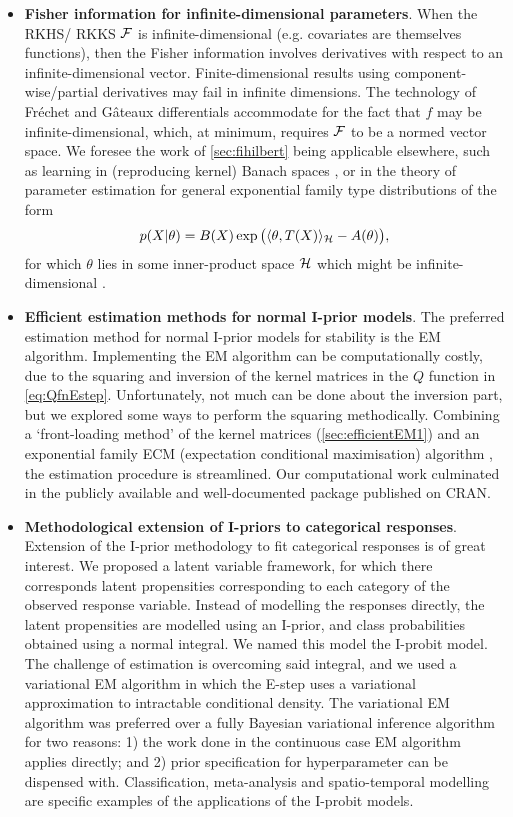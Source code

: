 \documentclass[showframe,11pt,twoside,openright]{report}
\begin{document}
\begin{itemize}
  \item \textbf{Fisher information for infinite-dimensional parameters}. 
  When the RKHS/ RKKS ${\mathcal F}$ is infinite-dimensional (e.g. covariates are themselves functions), then the Fisher information involves derivatives with respect to an infinite-dimensional vector.
  Finite-dimensional results using component-wise/partial derivatives may fail in infinite dimensions.
  The technology of Fréchet and Gâteaux differentials accommodate for the fact that $f$ may be infinite-dimensional, which, at minimum, requires ${\mathcal F}$ to be a  normed vector space. 
  We foresee the work of \cref{sec:fihilbert} being applicable elsewhere, such as learning in (reproducing kernel) Banach spaces \citep{zhang2009reproducing,zhang2012regularized}, or in the theory of parameter estimation for general exponential family type distributions of the form
  \[
    p(X|\theta) = B(X)\exp\big(\langle\theta,T(X)\rangle_{\mathcal H} - A(\theta) \big),
  \]
  for which $\theta$ lies in some inner-product space ${\mathcal H}$ which might be infinite-dimensional \citep{sriperumbudur2013density}.
  
  \item \textbf{Efficient estimation methods for normal I-prior models}. 
  The preferred estimation method for normal I-prior models for stability is the EM algorithm.
  Implementing the EM algorithm can be computationally costly, due to the squaring and inversion of the kernel matrices in the $Q$ function in \cref{eq:QfnEstep}.
  Unfortunately, not much can be done about the inversion part, but we explored some ways to perform the squaring methodically.
  Combining a `front-loading method' of the kernel matrices (\cref{sec:efficientEM1}) and an exponential family ECM (expectation conditional maximisation) algorithm \citep{meng1993maximum}, the estimation procedure is streamlined.
  Our computational work culminated in the publicly available and well-documented  package  \citep{jamil2017iprior} published on CRAN.
  
  \item \textbf{Methodological extension of I-priors to categorical responses}.
  Extension of the I-prior methodology to fit categorical responses is of great interest.
  We proposed a latent variable framework, for which there corresponds latent propensities corresponding to each category of the observed response variable.
  Instead of modelling the responses directly, the latent propensities are modelled using an I-prior, and class probabilities obtained using a normal integral.
  We named this model the I-probit model.
  The challenge of estimation is overcoming said integral, and we used a variational EM algorithm in which the E-step uses a variational approximation to intractable conditional density.
  The variational EM algorithm was preferred over a fully Bayesian variational inference algorithm for two reasons: 1) the work done in the continuous case EM algorithm applies directly; and 2) prior specification for hyperparameter can be dispensed with.
  Classification, meta-analysis and spatio-temporal modelling are specific examples of the applications of the I-probit models.
  

\end{itemize}
\end{document}
